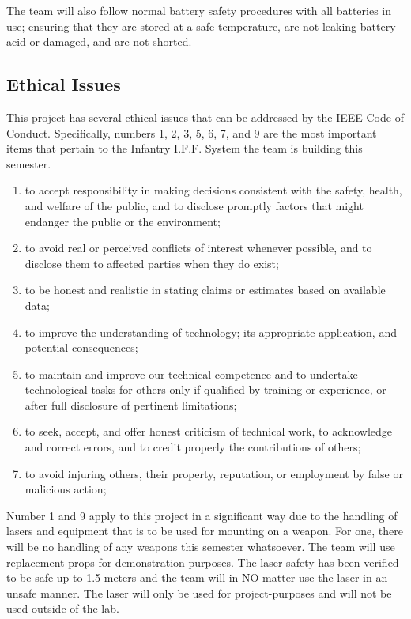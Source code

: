 \documentclass[letterpaper,10pt]{article}
\makeatletter
\newcommand{\skipitems}[1]{%
	\addtocounter{\@enumctr}{#1}%
}
\makeatother
\begin{document}
\begin{spacing}{1.15}
The team will also follow normal battery safety procedures with all batteries in use; ensuring that they are stored at a safe temperature, are not leaking battery acid or damaged, and are not shorted. 


\subsection{Ethical Issues}
This project has several ethical issues that can be addressed by the IEEE Code of Conduct. Specifically, numbers 1, 2, 3, 5, 6, 7, and 9 are the most important items that pertain to the Infantry I.F.F. System the team is building this semester. 
\begin{enumerate}
\item to accept responsibility in making decisions consistent with the safety, health, and welfare of the public, and to disclose promptly factors that might endanger the public or the environment;
\item to avoid real or perceived conflicts of interest whenever possible, and to disclose them to affected parties when they do exist;
\item to be honest and realistic in stating claims or estimates based on available data;  
\skipitems{1}
\item to improve the understanding of technology; its appropriate application, and potential consequences;  
\item to maintain and improve our technical competence and to undertake technological tasks for others only if qualified by training or experience, or after full disclosure of pertinent limitations;  
\item to seek, accept, and offer honest criticism of technical work, to acknowledge and correct errors, and to credit properly the contributions of others;  
\skipitems{1}
\item to avoid injuring others, their property, reputation, or employment by false or malicious action;  
\end{enumerate}
Number 1 and 9 apply to this project in a significant way due to the handling of lasers and equipment that is to be used for mounting on a weapon. For one, there will be no handling of any weapons this semester whatsoever. The team will use replacement props for demonstration purposes. The laser safety has been verified to be safe up to 1.5 meters and the team will in NO matter use the laser in an unsafe manner. The laser will only be used for project-purposes and will not be used outside of the lab.


\end{spacing}
\end{document}
